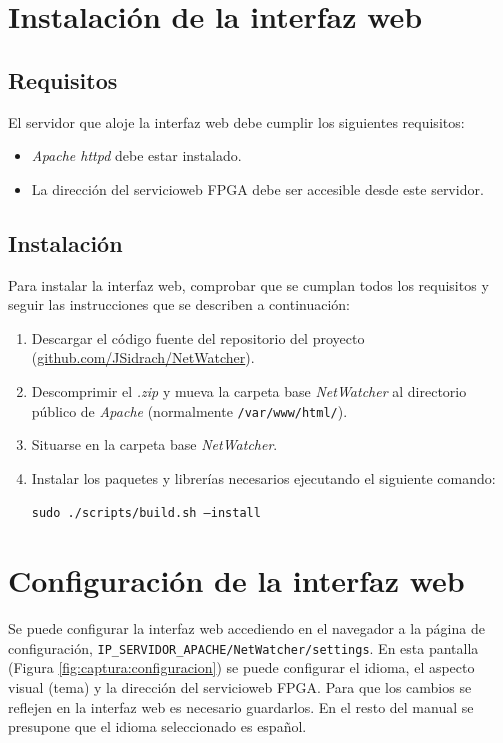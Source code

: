 \section{Instalación de la interfaz web\label{extra:manual:instalacionweb}}

\subsection*{Requisitos}
El servidor que aloje la interfaz web debe cumplir los siguientes requisitos:
\begin{itemize}
  \item \textit{Apache httpd} \cite{httpd} debe estar instalado.
  \item La dirección del \gls{servicioweb} \gls{FPGA} debe ser accesible desde este servidor.
\end{itemize}

\subsection*{Instalación}
Para instalar la interfaz web, comprobar que se cumplan todos los requisitos y seguir las instrucciones que se describen a continuación:
\begin{enumerate}
  \item Descargar el código fuente del repositorio del proyecto (\href{https://github.com/JSidrach/NetWatcher/archive/master.zip}{\footnotesize{github.com/JSidrach/NetWatcher}}).
  \item Descomprimir el \textit{.zip} y mueva la carpeta base \textit{NetWatcher} al directorio público de \textit{Apache} (normalmente \texttt{/var/www/html/}).
  \item Situarse en la carpeta base \textit{NetWatcher}.
  \item Instalar los paquetes y librerías necesarios ejecutando el siguiente comando:

  \texttt{sudo ./scripts/build.sh --install}
\end{enumerate}


\section{Configuración de la interfaz web\label{extra:manual:configweb}}

Se puede configurar la interfaz web accediendo en el navegador a la página de configuración, \texttt{IP\_SERVIDOR\_APACHE/NetWatcher/settings}. En esta pantalla (Figura \ref{fig:captura:configuracion}) se puede configurar el idioma, el aspecto visual (tema) y la dirección del \gls{servicioweb} \gls{FPGA}. Para que los cambios se reflejen en la interfaz web es necesario guardarlos. En el resto del manual se presupone que el idioma seleccionado es español.

